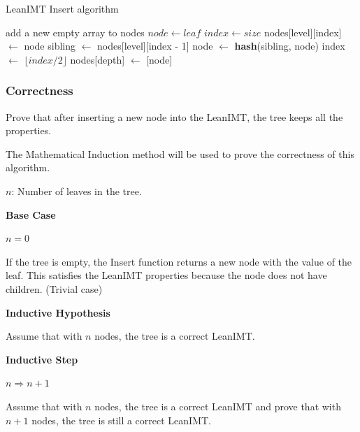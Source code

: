 \documentclass{article}
\begin{document}
\begin{algorithm}[H]
    \caption{LeanIMT Insert algorithm}\label{insert}
    \begin{algorithmic}[1]
         
        \State add a new empty array to nodes 
        \EndIf
        \State $node\gets leaf$
        \State $index\gets size$ 
        \State nodes[level][index] $\gets$ node
         
        \State sibling $\gets$ nodes[level][index - 1]
        \State node $\gets$ \textbf{hash}(sibling, node)
        \EndIf
        \State index $\gets$ $\lfloor index/2 \rfloor$ 
        \EndFor
        \State nodes[depth] $\gets$ [node] 
        \EndProcedure
    \end{algorithmic}
\end{algorithm}



\subsubsection{Correctness}
\label{sec:insert-correctness}

Prove that after inserting a new node into the LeanIMT, the tree keeps all the properties.

The Mathematical Induction method will be used to prove the correctness of this algorithm.

$n$: Number of leaves in the tree.

\textbf{Base Case}

$n=0$

If the tree is empty, the Insert function returns a new node with the value of the leaf. This satisfies the LeanIMT properties because the node does not have children. (Trivial case)

\textbf{Inductive Hypothesis}

Assume that with $n$ nodes, the tree is a correct LeanIMT.

\textbf{Inductive Step}

$n \Rightarrow n+1$

Assume that with $n$ nodes, the tree is a correct LeanIMT and prove that with $n+1$ nodes, the tree is still a correct LeanIMT.
\end{document}
